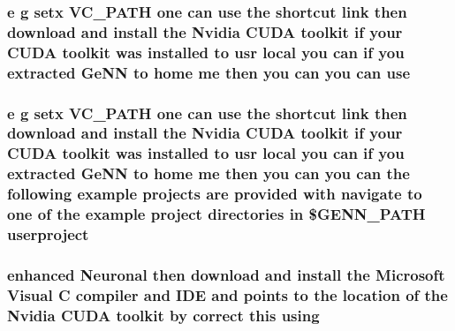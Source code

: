 \hypertarget{README_8txt_acf386c48a14a2099c9220d6bcde40fc8}{
\subsubsection[{use}]{\setlength{\rightskip}{0pt plus 5cm}e g setx V\+C\+\_\+\+P\+A\+T\+H one can use the shortcut link then download and install the Nvidia C\+U\+D\+A toolkit if your C\+U\+D\+A toolkit was installed {\bf to} usr local you can if you extracted {\bf Ge\+N\+N} {\bf to} home me then you can you can use}}\label{README_8txt_acf386c48a14a2099c9220d6bcde40fc8}
\hypertarget{README_8txt_a1741404a85795919ea7af1da382b872d}{
\subsubsection[{userproject}]{\setlength{\rightskip}{0pt plus 5cm}e g setx V\+C\+\_\+\+P\+A\+T\+H one can {\bf use} the shortcut link then download and install the Nvidia C\+U\+D\+A toolkit if your C\+U\+D\+A toolkit was installed {\bf to} usr local you can if you extracted {\bf Ge\+N\+N} {\bf to} home me then you can you can the following example projects are provided {\bf with} navigate {\bf to} one of the example {\bf project} directories {\bf in} \$G\+E\+N\+N\+\_\+\+P\+A\+T\+H userproject}}\label{README_8txt_a1741404a85795919ea7af1da382b872d}
\hypertarget{README_8txt_a914e3a56b7351927e7721e0d4168afb5}{
\subsubsection[{using}]{ enhanced Neuronal then download and install the Microsoft Visual {\bf C} compiler and I\+D\+E and points {\bf to} the location of the Nvidia C\+U\+D\+A toolkit by correct this using}}\label{README_8txt_a914e3a56b7351927e7721e0d4168afb5}
